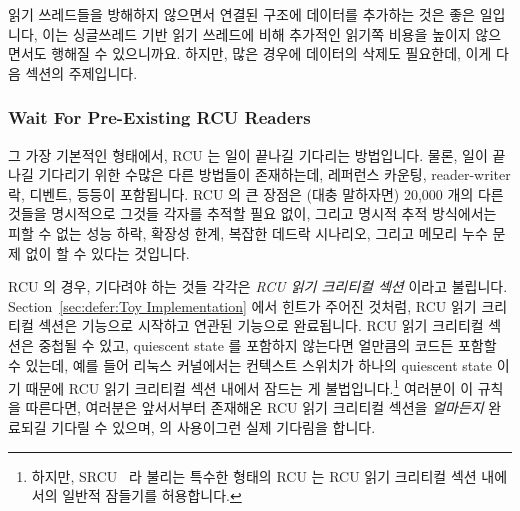 읽기 쓰레드들을 방해하지 않으면서 연결된 구조에 데이터를 추가하는 것은 좋은
일입니다, 이는 싱글쓰레드 기반 읽기 쓰레드에 비해 추가적인 읽기쪽 비용을 높이지
않으면서도 행해질 수 있으니까요.
하지만, 많은 경우에 데이터의 삭제도 필요한데, 이게 다음 섹션의 주제입니다.

\subsubsection{Wait For Pre-Existing RCU Readers}
\label{sec:defer:Wait For Pre-Existing RCU Readers}

그 가장 기본적인 형태에서, RCU 는 일이 끝나길 기다리는 방법입니다.
물론, 일이 끝나길 기다리기 위한 수많은 다른 방법들이 존재하는데, 레퍼런스
카운팅, reader-writer 락, 디벤트, 등등이 포함됩니다.
RCU 의 큰 장점은 (대충 말하자면) 20,000 개의 다른 것들을 명시적으로 그것들
각자를 추적할 필요 없이, 그리고 명시적 추적 방식에서는 피할 수 없는 성능 하락,
확장성 한계, 복잡한 데드락 시나리오, 그리고 메모리 누수 문제 없이 할 수 있다는
것입니다.

RCU 의 경우, 기다려야 하는 것들 각각은 \emph{RCU 읽기 크리티컬 섹션} 이라고
불립니다.
Section~\ref{sec:defer:Toy Implementation} 에서 힌트가 주어진 것처럼, RCU 읽기
크리티컬 섹션은  기능으로 시작하고 연관된
 기능으로 완료됩니다.
RCU 읽기 크리티컬 섹션은 중첩될 수 있고, quiescent state 를 포함하지
않는다면 얼만큼의 코드든 포함할 수 있는데, 예를 들어 리눅스 커널에서는 컨텍스트
스위치가 하나의 quiescent state 이기 때문에 RCU 읽기 크리티컬 섹션 내에서
잠드는 게 불법입니다.\footnote{
	하지만, SRCU~\cite{PaulEMcKenney2006c} 라 불리는 특수한 형태의 RCU 는
	RCU 읽기 크리티컬 섹션 내에서의 일반적 잠들기를 허용합니다.}
여러분이 이 규칙을 따른다면, 여러분은 앞서서부터 존재해온 RCU 읽기 크리티컬
섹션을 \emph{얼마든지} 완료되길 기다릴 수 있으며,  의
사용이그런 실제 기다림을 합니다.


